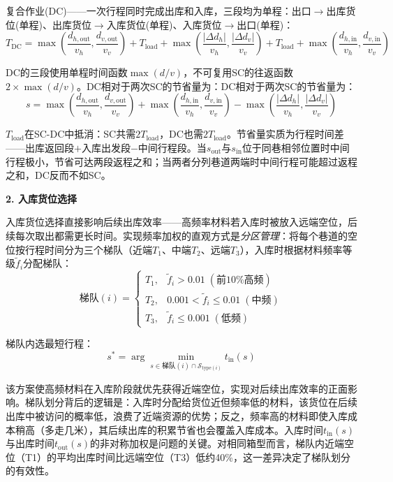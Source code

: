\documentclass[a4paper]{cumcmthesis}
\newcommand{\cS}{\mathcal{S}}
\newcommand{\ftilde}{\tilde{f}}
\begin{document}
复合作业(DC)——一次行程同时完成出库和入库，三段均为单程：出口$\to$出库货位(单程)、出库货位$\to$入库货位(单程)、入库货位$\to$出口(单程)：
\begin{equation}
T_{\text{DC}}=\max\left(\frac{d_{h,\text{out}}}{v_h},\frac{d_{v,\text{out}}}{v_v}\right)+T_{\text{load}}+\max\left(\frac{|\Delta d_h|}{v_h},\frac{|\Delta d_v|}{v_v}\right)+T_{\text{load}}+\max\left(\frac{d_{h,\text{in}}}{v_h},\frac{d_{v,\text{in}}}{v_v}\right)
\end{equation}

DC的三段使用单程时间函数$\max(d/v)$，不可复用SC的往返函数$2\times\max(d/v)$。DC相对于两次SC的节省量为：DC相对于两次SC的节省量为：
\begin{equation}
s=\max\left(\frac{d_{h,\text{out}}}{v_h},\frac{d_{v,\text{out}}}{v_v}\right)+\max\left(\frac{d_{h,\text{in}}}{v_h},\frac{d_{v,\text{in}}}{v_v}\right)-\max\left(\frac{|\Delta d_h|}{v_h},\frac{|\Delta d_v|}{v_v}\right)
\end{equation}

$T_{\text{load}}$在SC-DC中抵消：SC共需$2T_{\text{load}}$，DC也需$2T_{\text{load}}$。节省量实质为行程时间差——出库返回段$+$入库出发段$-$中间行程段。当$s_{\text{out}}$与$s_{\text{in}}$位于同巷相邻位置时中间行程极小，节省可达两段返程之和；当两者分列巷道两端时中间行程可能超过返程之和，DC反而不如SC。

\textbf{2. 入库货位选择}

入库货位选择直接影响后续出库效率——高频率材料若入库时被放入远端空位，后续每次取出都需更长时间。实现频率加权的直观方式是\emph{分区管理}：将每个巷道的空位按行程时间分为三个梯队（近端$T_1$、中端$T_2$、远端$T_3$），入库时根据材料频率等级$\ftilde_i$分配梯队：
\begin{equation}
\mbox{梯队}(i)=\begin{cases}
T_1,&\ftilde_i>0.01\;(前10\%高频)\\
T_2,&0.001<\ftilde_i\leq 0.01\;(中频)\\
T_3,&\ftilde_i\leq 0.001\;(低频)
\end{cases}
\end{equation}

梯队内选最短行程：
\begin{equation}
s^*=\arg\min_{s\in\mbox{梯队}(i)\cap\cS_{\text{type}(i)}}t_{\text{in}}(s)
\end{equation}

该方案使高频材料在入库阶段就优先获得近端空位，实现对后续出库效率的正面影响。梯队划分背后的逻辑是：入库时分配给货位近但频率低的材料，该货位在后续出库中被访问的概率低，浪费了近端资源的优势；反之，频率高的材料即使入库成本稍高（多走几米），其后续出库的积累节省也会覆盖入库成本。入库时间$t_{\text{in}}(s)$与出库时间$t_{\text{out}}(s)$的非对称加权是问题的关键。对相同箱型而言，梯队内近端空位（T1）的平均出库时间比远端空位（T3）低约40\%，这一差异决定了梯队划分的有效性。
\end{document}
